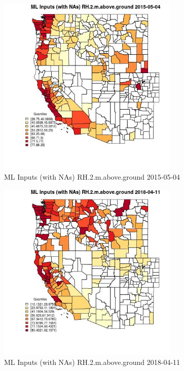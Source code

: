 \begin{figure} 
\centering  
\includegraphics[width=0.77\textwidth]{Code_Outputs/Report_ML_input_PM25_Step4_part_e_de_duplicated_aves_compiled_2019-05-18wNAs_CountyRH2mabovegroundMean2015-05-04_2015-05-04.jpg} 
\caption{\label{fig:Report_ML_input_PM25_Step4_part_e_de_duplicated_aves_compiled_2019-05-18wNAsCountyRH2mabovegroundMean2015-05-04_2015-05-04}ML Inputs (with NAs) RH.2.m.above.ground 2015-05-04} 
\end{figure} 
 

\clearpage 

\begin{figure} 
\centering  
\includegraphics[width=0.77\textwidth]{Code_Outputs/Report_ML_input_PM25_Step4_part_e_de_duplicated_aves_compiled_2019-05-18wNAs_CountyRH2mabovegroundMean2018-04-11_2018-04-11.jpg} 
\caption{\label{fig:Report_ML_input_PM25_Step4_part_e_de_duplicated_aves_compiled_2019-05-18wNAsCountyRH2mabovegroundMean2018-04-11_2018-04-11}ML Inputs (with NAs) RH.2.m.above.ground 2018-04-11} 
\end{figure} 
 

